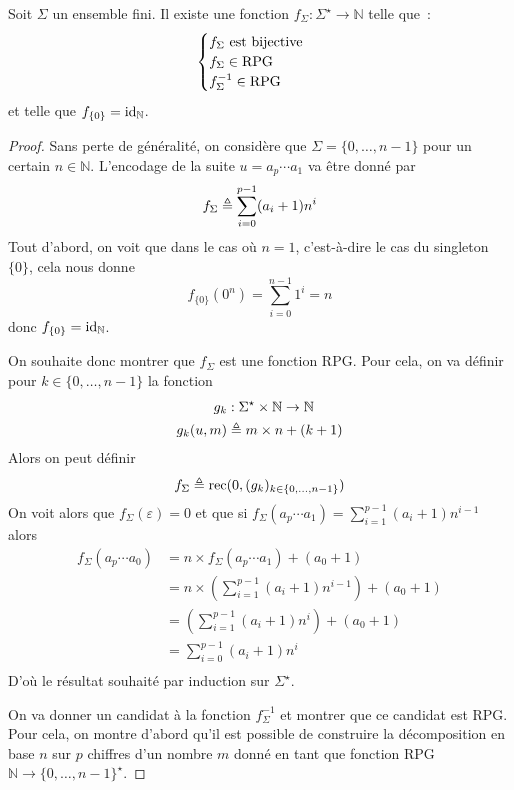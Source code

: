 \begin{definition}
  Soit $\Sigma$ un ensemble fini. Il existe une fonction
  $f_\Sigma : \Sigma^\star \to \mathbb N$ telle que~:
  \[\begin{cases}
  f_\Sigma\text{ est bijective }\\
  f_\Sigma\in \operatorname{RPG}\\
  f^{-1}_\Sigma\in\operatorname{RPG}
  \end{cases}\]
  et telle que $f_{\{0\}} = \operatorname{id}_{\mathbb N}$.
\end{definition}

\begin{proof}
  Sans perte de généralité, on considère que $\Sigma = \{0,\ldots,n-1\}$ pour un
  certain $n \in \mathbb N$. L'encodage de la suite $u = a_p\cdots a_1$ va être
  donné par
  \[f_\Sigma \triangleq \sum_{i = 0}^{p-1} (a_i + 1) n^i\]
  Tout d'abord, on voit que dans le cas où $n = 1$, c'est-à-dire le cas du
  singleton $\{0\}$, cela nous donne
  \[f_{\{0\}}(0^n) = \sum_{i = 0}^{n-1} 1^i = n\]
  donc $f_{\{0\}} = \operatorname{id}_\mathbb N$.

  On souhaite donc montrer que $f_\Sigma$ est une fonction RPG. Pour cela, on
  va définir pour $k \in \{0,\ldots,n-1\}$ la fonction
  \begin{align*}
  g_k &: \Sigma^\star \times \mathbb N \to \mathbb N\\
  g_k(u,m) &\triangleq m \times n + (k + 1)
  \end{align*}
  Alors on peut définir
  \[f_\Sigma \triangleq \operatorname{rec}(0,(g_k)_{k\in\{0,\ldots,n-1\}})\]
  On voit alors que $f_\Sigma(\varepsilon) = 0$ et que si
  $f_\Sigma(a_p\cdots a_1) = \sum_{i = 1}^{p-1} (a_i + 1)n^{i-1}$ alors
  \begin{align*}
    f_\Sigma(a_p\cdots a_0) &= n \times f_\Sigma(a_p\cdots a_1) + (a_0 + 1)\\
    &= n \times \left(\sum_{i = 1}^{p-1} (a_i + 1) n^{i-1}\right) + (a_0+1)\\
    &= \left(\sum_{i = 1}^{p-1} (a_i+1) n^i\right) + (a_0+1)\\
    &= \sum_{i = 0}^{p-1} (a_i + 1) n^i\\
  \end{align*}
  D'où le résultat souhaité par induction sur $\Sigma^\star$.

  On va donner un candidat à la fonction $f_\Sigma^{-1}$ et montrer que ce
  candidat est RPG. Pour cela, on montre d'abord qu'il est possible
  de construire la décomposition en base $n$ sur $p$ chiffres d'un nombre $m$
  donné en tant que fonction RPG $\mathbb N \to \{0,\ldots,n-1\}^\star$.


\end{proof}
